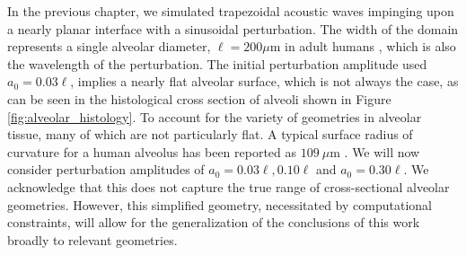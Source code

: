 In the previous chapter, we simulated trapezoidal acoustic waves
impinging upon a nearly planar interface with a sinusoidal
perturbation. The width of the domain represents a single alveolar
diameter, $\ell=200 \mu$m in adult humans \citep{Ochs2004}, which is
also the wavelength of the perturbation. The initial perturbation
amplitude used $a_0=0.03\ell$, implies a nearly flat alveolar surface,
which is not always the case, as can be seen in the histological cross
section of alveoli shown in Figure \ref{fig:alveolar_histology}. To
account for the variety of geometries in alveolar tissue, many of
which are not particularly flat. A typical surface radius of curvature
for a human alveolus has been reported as $109~\mu$m
\citep{Mercer1994}. We will now consider perturbation amplitudes of
$a_0=0.03\ell, 0.10\ell$ and $a_0=0.30\ell$. We acknowledge that this
does not capture the true range of cross-sectional alveolar
geometries. However, this simplified geometry, necessitated by
computational constraints, will allow for the generalization of the
conclusions of this work broadly to relevant geometries.
